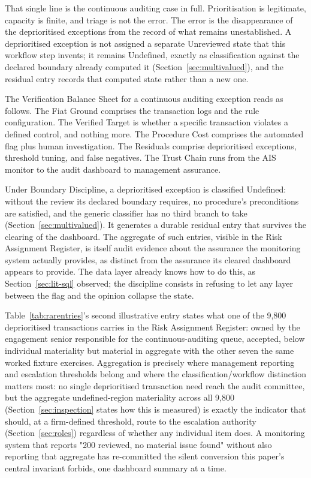 \documentclass[11pt,a4paper]{article}
\theoremstyle{definition}
\theoremstyle{remark}
\begin{document}
That single line is the continuous auditing case in full. Prioritisation is legitimate, capacity is finite, and triage is not the error. The error is the disappearance of the deprioritised exceptions from the record of what remains unestablished. A deprioritised exception is not assigned a separate \textsf{Unreviewed} state that this workflow step invents; it remains \textsf{Undefined}, exactly as classification against the declared boundary already computed it (Section~\ref{sec:multivalued}), and the residual entry records that computed state rather than a new one.

The Verification Balance Sheet for a continuous auditing exception reads as follows. The Fiat Ground comprises the transaction logs and the rule configuration. The Verified Target is whether a specific transaction violates a defined control, and nothing more. The Procedure Cost comprises the automated flag plus human investigation. The Residuals comprise deprioritised exceptions, threshold tuning, and false negatives. The Trust Chain runs from the AIS monitor to the audit dashboard to management assurance.

Under Boundary Discipline, a deprioritised exception is classified \textsf{Undefined}: without the review its declared boundary requires, no procedure's preconditions are satisfied, and the generic classifier has no third branch to take (Section~\ref{sec:multivalued}). It generates a durable residual entry that survives the clearing of the dashboard. The aggregate of such entries, visible in the Risk Assignment Register, is itself audit evidence about the assurance the monitoring system actually provides, as distinct from the assurance its cleared dashboard appears to provide. The data layer already knows how to do this, as Section~\ref{sec:lit-sql} observed; the discipline consists in refusing to let any layer between the flag and the opinion collapse the state.

Table~\ref{tab:rarentries}'s second illustrative entry states what one of the 9,800 deprioritised transactions carries in the Risk Assignment Register: owned by the engagement senior responsible for the continuous-auditing queue, accepted, below individual materiality but material in aggregate with the other seven the same worked fixture exercises. Aggregation is precisely where management reporting and escalation thresholds belong and where the classification/workflow distinction matters most: no single deprioritised transaction need reach the audit committee, but the aggregate undefined-region materiality across all 9,800 (Section~\ref{sec:inspection} states how this is measured) is exactly the indicator that should, at a firm-defined threshold, route to the escalation authority (Section~\ref{sec:roles}) regardless of whether any individual item does. A monitoring system that reports "200 reviewed, no material issue found" without also reporting that aggregate has re-committed the silent conversion this paper's central invariant forbids, one dashboard summary at a time.
\end{document}
